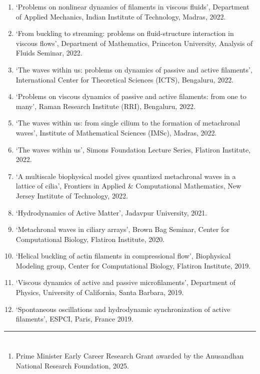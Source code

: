 \documentclass[10pt]{res} %
\begin{document}
\begin{resume}
\begin{enumerate}
	\item `Problems on nonlinear dynamics of filaments in viscous fluids', Department of Applied Mechanics, Indian Institute of Technology, Madras, 2022.
	\item `From buckling to streaming: problems on fluid-structure interaction in viscous flows', Department of Mathematics, Princeton University, Analysis of Fluids Seminar, 2022.
	\item `The waves within us: problems on dynamics of passive and active filaments', International Center for Theoretical Sciences (ICTS), Bengaluru, 2022.
	\item `Problems on viscous dynamics of passive and active filaments: from one to many', Raman Research Institute (RRI), Bengaluru, 2022.
	\item `The waves within us: from single cilium to the formation of metachronal waves', Institute of Mathematical Sciences (IMSc), Madras, 2022.
	\item `The waves within us', Simons Foundation Lecture Series, Flatiron Institute, 2022.
	\item `A multiscale biophysical model gives quantized metachronal waves in a lattice of cilia', Frontiers in Applied \& Computational Mathematics, New Jersey Institute of Technology, 2022.
	\item `Hydrodynamics of Active Matter', Jadavpur University,  2021.
	
	\item  `Metachronal waves in ciliary arrays', Brown Bag Seminar, Center for Computational Biology, Flatiron Institute, 2020.
	
	\item  `Helical buckling of actin filaments in compressional flow', Biophysical Modeling group, Center for Computational Biology, Flatiron Institute, 2019.
	
	\item `Viscous dynamics of active and passive microfilaments',  Department of Physics, University of California, Santa Barbara, 2019.
	
	\item `Spontaneous oscillations and hydrodynamic synchronization of active filaments', ESPCI, Paris, France 2019. 
\end{enumerate}

\vspace*{-2mm}

\noindent\rule{\textwidth}{0.6pt}
\vspace*{-10mm}
\section{}
\vspace*{5mm}
\begin{enumerate}
	\item Prime Minister Early Career Research Grant awarded by the Anusandhan National Research Foundation, 2025.
\end{enumerate}


\end{resume}
\end{document}
